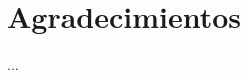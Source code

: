 \documentclass[conference]{IEEEtran}
\begin{document}


\section*{Agradecimientos}
...







%
%
%
\end{document}
